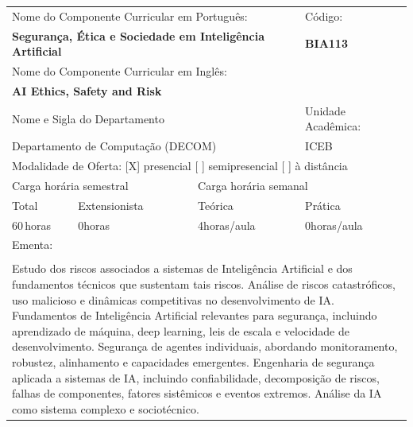 \documentclass[11pt]{article}
\begin{document}
\begin{center}
\begin{longtable}{|p{4cm}|p{4cm}|p{4cm}|p{4cm}|}
\hline
\multicolumn{3}{|p{12cm}|}{Nome do Componente Curricular em Português:} &
\multicolumn{1}{p{4cm}|}{Código:} \\ 
\multicolumn{3}{|p{12cm}|}{\textbf{Segurança, Ética e Sociedade em Inteligência Artificial}} &
\textbf{BIA113}\\ 
\multicolumn{3}{|p{12cm}|}{Nome do Componente Curricular em Inglês:} & \\ 
\multicolumn{3}{|p{12cm}|}{\textbf{AI Ethics, Safety and Risk}} & \\ 
\hline
\multicolumn{3}{|p{12cm}|}{Nome e Sigla do Departamento} & Unidade Acadêmica: \\ 
\multicolumn{3}{|p{12cm}|}{Departamento de Computação (DECOM)} & {ICEB} \\ 
\hline
\multicolumn{4}{|p{16cm}|}{Modalidade de Oferta:
[X] presencial \hspace{0.6cm}
[ ] semipresencial \hspace{0.6cm}
[ ] à distância}\\
\hline
\multicolumn{2}{|p{8cm}|}{Carga horária semestral} &
\multicolumn{2}{p{8cm}|}{Carga horária semanal}\\
\hline
\multicolumn{1}{|p{4cm}|}{Total} &
\multicolumn{1}{p{4cm}|}{Extensionista} &
\multicolumn{1}{p{4cm}|}{Teórica} &
\multicolumn{1}{p{4cm}|}{Prática} \\ 
\multicolumn{1}{|p{4cm}|}{60\,horas} &
\multicolumn{1}{p{4cm}|}{0\;horas} &
\multicolumn{1}{p{4cm}|}{4\;horas/aula} &
\multicolumn{1}{p{4cm}|}{0\;horas/aula} \\ 
\hline
\multicolumn{4}{|p{16cm}|}{Ementa:}\\
\multicolumn{4}{|p{16cm}|}{}\\
\multicolumn{4}{|p{\dimexpr 16cm + 6\tabcolsep\relax}|}{Estudo dos riscos associados a sistemas de Inteligência Artificial e dos fundamentos técnicos que sustentam tais riscos. Análise de riscos catastróficos, uso malicioso e dinâmicas competitivas no desenvolvimento de IA. Fundamentos de Inteligência Artificial relevantes para segurança, incluindo aprendizado de máquina, deep learning, leis de escala e velocidade de desenvolvimento. Segurança de agentes individuais, abordando monitoramento, robustez, alinhamento e capacidades emergentes. Engenharia de segurança aplicada a sistemas de IA, incluindo confiabilidade, decomposição de riscos, falhas de componentes, fatores sistêmicos e eventos extremos. Análise da IA como sistema complexo e sociotécnico.}\\

\end{longtable}
\end{center}
\end{document}
